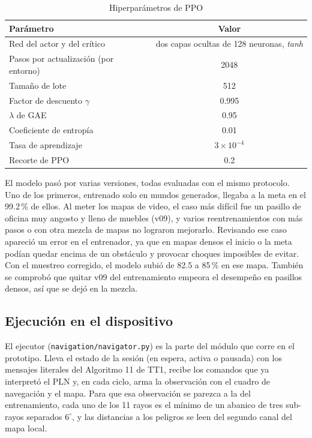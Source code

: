 \begin{table}[H]
\centering
\caption{Hiperparámetros de PPO}
\label{tab:nav_ppo}
\renewcommand{\arraystretch}{1.2}
\begin{tabular}{|l|c|}
\hline
\textbf{Parámetro} & \textbf{Valor} \\
\hline
Red del actor y del crítico & dos capas ocultas de 128 neuronas, \emph{tanh} \\
Pasos por actualización (por entorno) & 2048 \\
Tamaño de lote & 512 \\
Factor de descuento $\gamma$ & 0.995 \\
$\lambda$ de GAE & 0.95 \\
Coeficiente de entropía & 0.01 \\
Tasa de aprendizaje & $3 \times 10^{-4}$ \\
Recorte de PPO & 0.2 \\
\hline
\end{tabular}
\end{table}

El modelo pasó por varias versiones, todas evaluadas con el mismo protocolo. Uno de los
primeros, entrenado solo en mundos generados, llegaba a la meta en el 99.2\,\% de ellos.
Al meter los mapas de video, el caso más difícil fue un pasillo de oficina muy angosto y
lleno de muebles (v09), y varios reentrenamientos con más pasos o con otra mezcla de
mapas no lograron mejorarlo. Revisando ese caso apareció un error en el entrenador, ya
que en mapas densos el inicio o la meta podían quedar encima de un obstáculo y provocar
choques imposibles de evitar. Con el muestreo corregido, el modelo subió de 82.5 a
85\,\% en ese mapa. También se comprobó que quitar v09 del entrenamiento empeora el
desempeño en pasillos densos, así que se dejó en la mezcla.

\subsection{Ejecución en el dispositivo}

El ejecutor (\texttt{navigation/navigator.py}) es la parte del módulo que corre en el
prototipo. Lleva el estado de la sesión (en espera, activa o pausada) con los mensajes
literales del Algoritmo 11 de TT1, recibe los comandos que ya interpretó el PLN y, en
cada ciclo, arma la observación con el cuadro de navegación y el mapa. Para que esa
observación se parezca a la del entrenamiento, cada uno de los 11 rayos es el mínimo de
un abanico de tres sub-rayos separados $6^\circ$, y las distancias a los peligros se
leen del segundo canal del mapa local.

